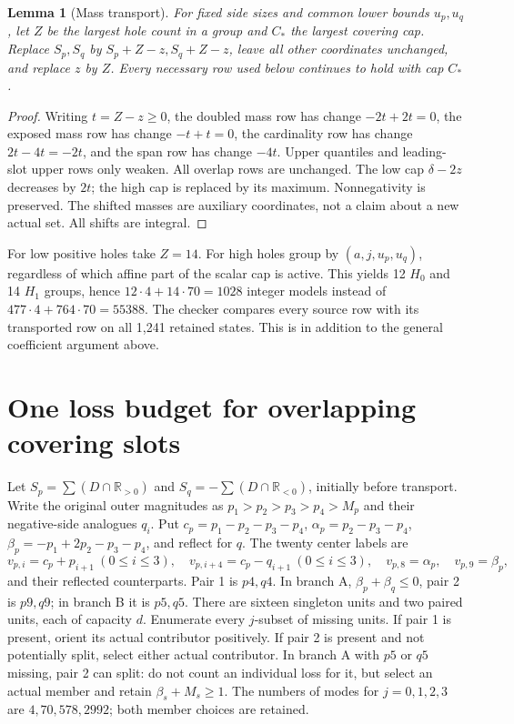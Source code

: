 \documentclass[11pt,a4paper]{article}
\newtheorem{lemma}[theorem]{Lemma}
\begin{document}
\begin{lemma}[Mass transport]
For fixed side sizes and common lower bounds $u_p,u_q$, let $Z$ be the
largest hole count in a group and $C_*$ the largest covering cap.
Replace $S_p,S_q$ by $S_p+Z-z,S_q+Z-z$, leave all other coordinates
unchanged, and replace $z$ by $Z$. Every necessary row used below
continues to hold with cap $C_*$.
\end{lemma}
\begin{proof}
Writing $t=Z-z\ge0$, the doubled mass row has change
$-2t+2t=0$, the exposed mass row has change $-t+t=0$, the
cardinality row has change $2t-4t=-2t$, and the span row has change
$-4t$. Upper quantiles and leading-slot upper rows only weaken.
All overlap rows are unchanged. The low cap $\delta-2z$ decreases
by $2t$; the high cap is replaced by its maximum. Nonnegativity is
preserved. The shifted masses are auxiliary coordinates, not a claim
about a new actual set. All shifts are integral.
\end{proof}
For low positive holes take $Z=14$. For high holes group by
$(a,j,u_p,u_q)$, regardless of which affine part of the scalar cap is
active. This yields 12 $H_0$ and 14 $H_1$ groups, hence
$12\cdot4+14\cdot70=1028$ integer models instead of
$477\cdot4+764\cdot70=55388$.
The checker compares every source row with its transported row on all
1,241 retained states. This is in addition to the general coefficient
argument above.

\section{One loss budget for overlapping covering slots}
Let $S_p=\sum(D\cap\mathbb R_{>0})$ and
$S_q=-\sum(D\cap\mathbb R_{<0})$, initially before transport.
Write the original outer magnitudes as
$p_1>p_2>p_3>p_4>M_p$ and their negative-side analogues $q_i$.
Put $c_p=p_1-p_2-p_3-p_4$, $\alpha_p=p_2-p_3-p_4$,
$\beta_p=-p_1+2p_2-p_3-p_4$, and reflect for $q$.
The twenty center labels are
\[
 v_{p,i}=c_p+p_{i+1}\ (0\le i\le3),\quad
 v_{p,i+4}=c_p-q_{i+1}\ (0\le i\le3),\quad
 v_{p,8}=\alpha_p,\quad v_{p,9}=\beta_p,
\]
and their reflected counterparts. Pair 1 is $p4,q4$. In branch A,
$\beta_p+\beta_q\le0$, pair 2 is $p9,q9$; in branch B it is $p5,q5$.
There are sixteen singleton units and two paired units, each of capacity
$d$. Enumerate every $j$-subset of missing units. If pair 1 is present,
orient its actual contributor positively. If pair 2 is present and
not potentially split, select either actual contributor. In branch A
with $p5$ or $q5$ missing, pair 2 can split: do not count an individual
loss for it, but select an actual member and retain
$\beta_s+M_s\ge1$. The numbers of modes for $j=0,1,2,3$ are
$4,70,578,2992$; both member choices are retained.
\end{document}

